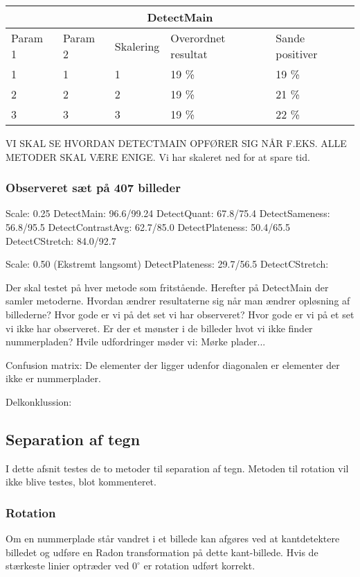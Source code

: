 \begin{tabular}{|l|l|l|l|l|}
\hline
\multicolumn{5}{|c|}{DetectMain} \\ \hline
Param 1 & Param 2 & Skalering & Overordnet resultat & Sande positiver\\ \hline
1 & 1 & 1 & 19 \% & 19 \%\\ \hline
2 & 2 & 2 & 19 \% & 21 \% \\ \hline
3 & 3 & 3 & 19 \% & 22 \% \\
\hline
\end{tabular}


VI SKAL SE HVORDAN DETECTMAIN OPFØRER SIG NÅR F.EKS. ALLE METODER SKAL VÆRE ENIGE.
 Vi har skaleret ned for at spare tid.

\subsubsection*{Observeret sæt på 407 billeder}
Scale: 0.25
DetectMain: 96.6/99.24
DetectQuant: 67.8/75.4
DetectSameness: 56.8/95.5
DetectContrastAvg: 62.7/85.0
DetectPlateness: 50.4/65.5
DetectCStretch: 84.0/92.7

Scale: 0.50 (Ekstremt langsomt)
DetectPlateness: 29.7/56.5
DetectCStretch:

Der skal testet på hver metode som fritstående. Herefter på DetectMain der samler metoderne. Hvordan ændrer resultaterne sig når man ændrer opløsning af billederne?
Hvor gode er vi på det set vi har observeret? Hvor gode er vi på et set vi ikke har observeret. Er der et mønster i de billeder hvot vi ikke finder nummerpladen? Hvile udfordringer møder vi: Mørke plader... 

Confusion matrix: De elementer der ligger udenfor diagonalen er elementer der ikke er nummerplader.




Delkonklussion:


\subsection{Separation af tegn}
I dette afsnit testes de to metoder til separation af tegn. Metoden til rotation vil ikke blive testes, blot kommenteret.

\subsubsection*{Rotation}
Om en nummerplade står vandret i et billede kan afgøres ved at kantdetektere billedet og udføre en Radon transformation på dette kant-billede. Hvis de stærkeste linier optræder ved $0^{\circ}$ er rotation udført korrekt.

